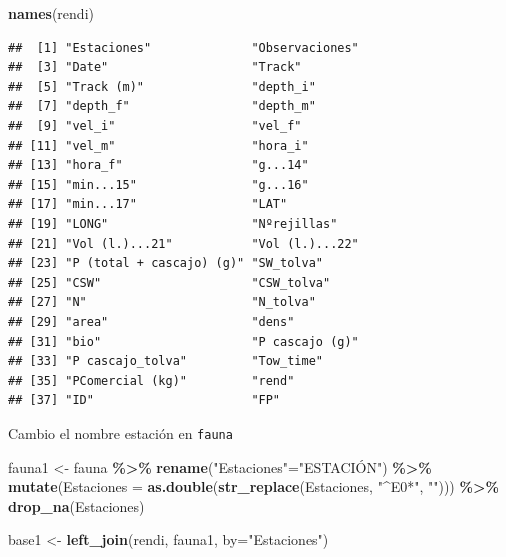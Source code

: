 \documentclass[
]{article}
\newenvironment{Shaded}{\begin{snugshade}}{\end{snugshade}}
\newcommand{\AttributeTok}[1]{\textcolor[rgb]{0.13,0.29,0.53}{#1}}
\newcommand{\FunctionTok}[1]{\textcolor[rgb]{0.13,0.29,0.53}{\textbf{#1}}}
\newcommand{\NormalTok}[1]{#1}
\newcommand{\OtherTok}[1]{\textcolor[rgb]{0.56,0.35,0.01}{#1}}
\newcommand{\SpecialCharTok}[1]{\textcolor[rgb]{0.81,0.36,0.00}{\textbf{#1}}}
\newcommand{\StringTok}[1]{\textcolor[rgb]{0.31,0.60,0.02}{#1}}
\begin{document}
\begin{Shaded}
\begin{Highlighting}[]
\FunctionTok{names}\NormalTok{(rendi)}
\end{Highlighting}
\end{Shaded}

\begin{verbatim}
##  [1] "Estaciones"              "Observaciones"          
##  [3] "Date"                    "Track"                  
##  [5] "Track (m)"               "depth_i"                
##  [7] "depth_f"                 "depth_m"                
##  [9] "vel_i"                   "vel_f"                  
## [11] "vel_m"                   "hora_i"                 
## [13] "hora_f"                  "g...14"                 
## [15] "min...15"                "g...16"                 
## [17] "min...17"                "LAT"                    
## [19] "LONG"                    "Nºrejillas"             
## [21] "Vol (l.)...21"           "Vol (l.)...22"          
## [23] "P (total + cascajo) (g)" "SW_tolva"               
## [25] "CSW"                     "CSW_tolva"              
## [27] "N"                       "N_tolva"                
## [29] "area"                    "dens"                   
## [31] "bio"                     "P cascajo (g)"          
## [33] "P cascajo_tolva"         "Tow_time"               
## [35] "PComercial (kg)"         "rend"                   
## [37] "ID"                      "FP"
\end{verbatim}

Cambio el nombre estación en \texttt{fauna}

\begin{Shaded}
\begin{Highlighting}[]
\NormalTok{fauna1 }\OtherTok{\textless{}{-}}\NormalTok{ fauna }\SpecialCharTok{\%\textgreater{}\%} 
  \FunctionTok{rename}\NormalTok{(}\StringTok{"Estaciones"}\OtherTok{=}\StringTok{"ESTACIÓN"}\NormalTok{) }\SpecialCharTok{\%\textgreater{}\%} 
  \FunctionTok{mutate}\NormalTok{(}\AttributeTok{Estaciones =} \FunctionTok{as.double}\NormalTok{(}\FunctionTok{str\_replace}\NormalTok{(Estaciones, }\StringTok{"\^{}E0*"}\NormalTok{, }\StringTok{""}\NormalTok{))) }\SpecialCharTok{\%\textgreater{}\%} 
  \FunctionTok{drop\_na}\NormalTok{(Estaciones)}
\end{Highlighting}
\end{Shaded}

\begin{Shaded}
\begin{Highlighting}[]
\NormalTok{base1  }\OtherTok{\textless{}{-}} \FunctionTok{left\_join}\NormalTok{(rendi, fauna1,}
                   \AttributeTok{by=}\StringTok{"Estaciones"}\NormalTok{)}
\end{Highlighting}
\end{Shaded}
\end{document}
